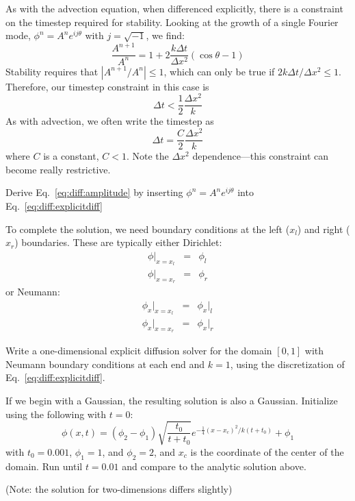 As with the advection equation, when differenced explicitly, there is
a constraint on the timestep required for stability.  Looking at the
growth of a single Fourier mode, $\phi^n = A^n e^{ij\theta}$ with $j =
\sqrt{-1}$, we find:
\begin{equation}
\label{eq:diff:amplitude}
\frac{A^{n+1}}{A^n} = 1 + 2 \frac{k \Delta t}{\Delta x^2} ( \cos\theta - 1)
\end{equation}
Stability requires that $|A^{n+1}/A^n| \le 1$, which can only be true
if $2k\Delta t/\Delta x^2 \le 1$.  Therefore, our timestep
constraint in this case is
\begin{equation}
\label{eq:diff:dt}
\Delta t < \frac{1}{2} \frac{\Delta x^2}{k}
\end{equation}
As with advection, we often write the timestep as
\begin{equation}
\Delta t = \frac{C}{2} \frac{\Delta x^2}{k}
\end{equation}
where $C$ is a constant, $C < 1$. 
Note the $\Delta x^2$ dependence---this constraint can become really
restrictive.

\begin{exercise}
Derive Eq.~\ref{eq:diff:amplitude} by inserting $\phi^n = A^n e^{ij\theta}$
into Eq.~\ref{eq:diff:explicitdiff}
\end{exercise}

To complete the solution, we need boundary conditions at the left
($x_l$) and right ($x_r$) boundaries.  These are typically either
Dirichlet:
\begin{eqnarray}
\phi |_{x=x_l} &=& \phi_l\\
\phi |_{x=x_r} &=& \phi_r
\end{eqnarray}
or Neumann:
\begin{eqnarray}
\phi_x |_{x=x_l} &=& \phi_x |_l\\
\phi_x |_{x=x_r} &=& \phi_x |_r
\end{eqnarray}

\begin{exercise}
{Write a one-dimensional explicit diffusion solver for the
  domain $[0,1]$ with Neumann boundary conditions at each end and $k = 1$,
  using the discretization of Eq.~\ref{eq:diff:explicitdiff}.

  If we begin with a Gaussian, the resulting solution is also a Gaussian.
  Initialize using the following with $t = 0$:
  \begin{equation}
   \phi(x,t) = (\phi_2 - \phi_1) \sqrt{\frac{t_0}{t + t_0}} e^{-\frac{1}{4}(x - x_c)^2/k(t+t_0)} + \phi_1
  \end{equation}
  with $t_0 = 0.001$, $\phi_1 = 1$, and $\phi_2 = 2$, and $x_c$ is the
  coordinate of the center of the domain.  Run until $t = 0.01$ and
  compare to the analytic solution above.

  (Note: the solution for two-dimensions differs slightly) }
\end{exercise}


